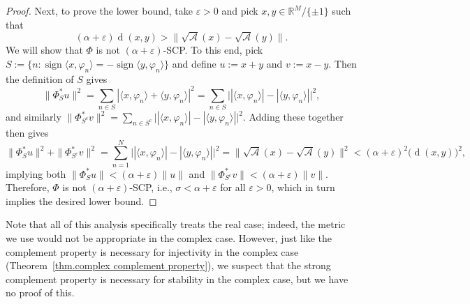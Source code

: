 \documentclass[times,10pt]{elsarticle}
\theoremstyle{plain}
\begin{document}
\begin{proof}
Next, to prove the lower bound, take $\varepsilon>0$ and pick $x,y\in\mathbb{R}^M/\{\pm1\}$ such that 
\begin{equation*}
(\alpha+\varepsilon)\operatorname{d}(x,y)
>\|\sqrt{\mathcal{A}}(x)-\sqrt{\mathcal{A}}(y)\|.
\end{equation*}
We will show that $\Phi$ is not $(\alpha+\varepsilon)$-SCP.
To this end, pick $S:=\{n:\operatorname{sign}\langle x,\varphi_n\rangle=-\operatorname{sign}\langle y,\varphi_n\rangle\}$ and define $u:=x+y$ and $v:=x-y$.
Then the definition of $S$ gives
\begin{equation*}
\|\Phi_S^*u\|^2
=\sum_{n\in S}|\langle x,\varphi_n\rangle+\langle y,\varphi_n\rangle|^2
=\sum_{n\in S}\big||\langle x,\varphi_n\rangle|-|\langle y,\varphi_n\rangle|\big|^2,
\end{equation*}
and similarly $\|\Phi_{S^\mathrm{c}}^*v\|^2=\sum_{n\in S^\mathrm{c}}\big||\langle x,\varphi_n\rangle|-|\langle y,\varphi_n\rangle|\big|^2$.
Adding these together then gives
\begin{equation*}
\|\Phi_S^*u\|^2+\|\Phi_{S^\mathrm{c}}^*v\|^2
=\sum_{n=1}^N\big||\langle x,\varphi_n\rangle|-|\langle y,\varphi_n\rangle|\big|^2
=\|\sqrt{\mathcal{A}}(x)-\sqrt{\mathcal{A}}(y)\|^2
<(\alpha+\varepsilon)^2\big(\operatorname{d}(x,y)\big)^2,
\end{equation*}
implying both $\|\Phi_S^*u\|<(\alpha+\varepsilon)\|u\|$ and $\|\Phi_{S^\mathrm{c}}^*v\|<(\alpha+\varepsilon)\|v\|$.
Therefore, $\Phi$ is not $(\alpha+\varepsilon)$-SCP, i.e., $\sigma<\alpha+\varepsilon$ for all $\varepsilon>0$, which in turn implies the desired lower bound.
\qquad
\end{proof}

Note that all of this analysis specifically treats the real case; indeed, the metric we use would not be appropriate in the complex case.
However, just like the complement property is necessary for injectivity in the complex case (Theorem~\ref{thm.complex complement property}), we suspect that the strong complement property is necessary for stability in the complex case, but we have no proof of this.
\end{document}
